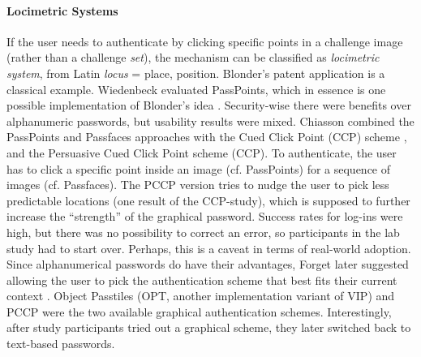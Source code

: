 	
	\paragraph{Locimetric Systems}
	If the user needs to authenticate by clicking specific points in a challenge image (rather than a challenge \textit{set}), the mechanism can be classified as \textit{locimetric system}, from Latin \textit{locus} = place, position. Blonder's patent application \cite{Blonder1996PatentGraphicalPW} is a classical example. Wiedenbeck \etal evaluated PassPoints, which in essence is one possible implementation of Blonder's idea \cite{Wiedenbeck2005PassPoints}. Security-wise there were benefits over alphanumeric passwords, but usability results were mixed. Chiasson \etal combined the PassPoints and Passfaces approaches with the Cued Click Point (CCP) scheme \cite{Chiasson2007CCP}, and the Persuasive Cued Click Point scheme \cite{Chiasson2008PCCP} (CCP). To authenticate, the user has to click a specific point inside an image (cf. PassPoints) for a sequence of images (cf. Passfaces). The PCCP version tries to nudge the user to pick less predictable locations (one result of the CCP-study), which is supposed to further increase the ``strength'' of the graphical password. Success rates for log-ins were high, but there was no possibility to correct an error, so participants in the lab study had to start over. Perhaps, this is a caveat in terms of real-world adoption. Since alphanumerical passwords do have their advantages, Forget \etal later suggested allowing the user to pick the authentication scheme that best fits their current context \cite{Forget2015CYOA}. Object Passtiles (OPT, another implementation variant of VIP) and PCCP were the two available graphical authentication schemes. Interestingly, after study participants tried out a graphical scheme, they later switched back to text-based passwords. 
	
